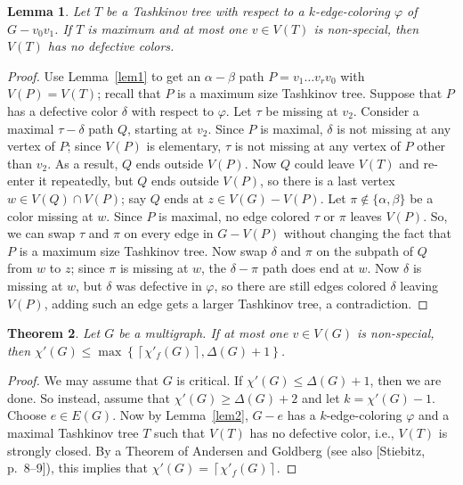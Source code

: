 \documentclass[12pt]{amsart}
\theoremstyle{plain}
\newtheorem{thm}{Theorem}
\newtheorem{lem}[thm]{Lemma}
\theoremstyle{definition}
\theoremstyle{remark}
\newcommand{\set}[1]{\left\{ #1 \right\}}
\newcommand{\ceil}[1]{\left\lceil#1\right\rceil}
\newcommand{\vph}{\varphi}
\begin{document}
\begin{lem}\label{AtMostOneNonSpecial}
Let $T$ be a Tashkinov tree with respect to a $k$-edge-coloring $\vph$ of $G - v_0v_1$.  If $T$ is maximum and at most one $v \in V(T)$ is
non-special, then $V(T)$ has no defective colors.
\label{lem2}
\end{lem}
\begin{proof}
Use Lemma~\ref{lem1} to get an $\alpha-\beta$ path $P = v_1\ldots v_rv_0$ with
$V(P) = V(T)$; recall that $P$ is a maximum size Tashkinov tree.  Suppose that
$P$ has a defective color $\delta$ with respect to $\vph$. Let $\tau$ be
missing at $v_2$. Consider a maximal $\tau-\delta$ path $Q$, starting at $v_2$.  
Since $P$ is maximal, $\delta$ is not missing at any vertex of $P$;
since $V(P)$ is elementary, $\tau$ is not missing at any vertex of $P$ other 
than $v_2$.  As a result, $Q$ ends outside $V(P)$.  Now $Q$ could leave
$V(T)$ and re-enter it repeatedly, %
but $Q$ ends outside $V(P)$, so there is a last vertex $w \in V(Q) \cap V(P)$;
say $Q$ ends at $z \in V(G) - V(P)$.  Let $\pi \notin \{\alpha, \beta\}$ be a
color missing at $w$.  Since
$P$ is maximal, no edge colored $\tau$ or $\pi$ leaves $V(P)$.  So, we can
swap $\tau$ and $\pi$ on every edge in $G - V(P)$ without changing the fact that
$P$ is a maximum size Tashkinov tree.  Now swap $\delta$ and $\pi$ on the
subpath of $Q$ from $w$ to $z$;
since $\pi$ is missing at $w$, the $\delta-\pi$ path does end at $w$.  Now
$\delta$ is missing at $w$, but $\delta$ was defective in $\vph$, so there are
still edges colored $\delta$ leaving $V(P)$, adding such an edge gets a larger
Tashkinov tree, a contradiction.
\end{proof}

\begin{thm}\label{AllSpecialImpliesElementary}
Let $G$ be a multigraph.
If at most one $v \in V(G)$ is non-special, then
$\chi'(G) \le \max \set{\ceil{\chi'_f(G)}, \Delta(G) + 1}$.
\end{thm}
\begin{proof}
We may assume that $G$ is critical.
If $\chi'(G)\le \Delta(G)+1$, then we are done.
So instead, assume that $\chi'(G)\ge \Delta(G)+2$ and let $k=\chi'(G)-1$.
Choose $e\in E(G)$.  Now by Lemma~\ref{lem2}, $G-e$ has a $k$-edge-coloring
$\vph$ and a maximal Tashkinov tree $T$ such that $V(T)$ has no defective color, i.e.,
$V(T)$ is strongly closed.  By a Theorem of Andersen and Goldberg (see also
[Stiebitz, p.~8--9]), this implies that $\chi'(G)=\ceil{\chi'_f(G)}$.
\end{proof}
\end{document}
